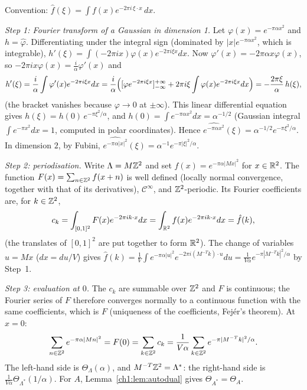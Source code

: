 \begin{humanproof}
Convention: $\hat f(\xi)=\int f(x)e^{-2\pi i\,\xi\cdot x}\,dx$.

\emph{Step 1: Fourier transform of a Gaussian in dimension 1.} Let $\varphi(x)=e^{-\pi\alpha x^2}$ and $h=\hat\varphi$.
Differentiating under the integral sign (dominated by $|x|e^{-\pi\alpha x^2}$, which is integrable),
$h'(\xi)=\int(-2\pi i x)\varphi(x)e^{-2\pi i\xi x}dx$. Now $\varphi'(x)=-2\pi\alpha x\varphi(x)$, so $-2\pi ix\varphi(x)=\frac{i}{\alpha}\varphi'(x)$ and
\[
  h'(\xi)=\frac i\alpha\int\varphi'(x)e^{-2\pi i\xi x}dx=\frac i\alpha\Bigl([\varphi e^{-2\pi i\xi x}]_{-\infty}^{+\infty}+2\pi i\xi\int\varphi(x)e^{-2\pi i\xi x}dx\Bigr)=-\frac{2\pi\xi}{\alpha}\,h(\xi),
\]
(the bracket vanishes because $\varphi\to0$ at $\pm\infty$). This linear differential equation gives $h(\xi)=h(0)\,e^{-\pi\xi^2/\alpha}$, and
$h(0)=\int e^{-\pi\alpha x^2}dx=\alpha^{-1/2}$ (Gaussian integral $\int e^{-\pi x^2}dx=1$, computed in polar coordinates). Hence
$\widehat{e^{-\pi\alpha x^2}}(\xi)=\alpha^{-1/2}e^{-\pi\xi^2/\alpha}$. In dimension $2$, by Fubini,
$\widehat{e^{-\pi\alpha|x|^2}}(\xi)=\alpha^{-1}e^{-\pi|\xi|^2/\alpha}$.

\emph{Step 2: periodisation.} Write $\Lambda=M\mathbb{Z}^2$ and set $f(x)=e^{-\pi\alpha|Mx|^2}$ for $x\in\mathbb{R}^2$. The function
$F(x)=\sum_{n\in\mathbb{Z}^2}f(x+n)$ is well defined (locally normal convergence, together with that of its derivatives), $\mathcal C^\infty$, and $\mathbb{Z}^2$-periodic.
Its Fourier coefficients are, for $k\in\mathbb{Z}^2$,
\[
  c_k=\int_{[0,1]^2}F(x)e^{-2\pi ik\cdot x}dx=\int_{\mathbb{R}^2}f(x)e^{-2\pi ik\cdot x}dx=\hat f(k),
\]
(the translates of $[0,1]^2$ are put together to form $\mathbb{R}^2$). The change of variables $u=Mx$ ($dx=du/V$) gives
$\hat f(k)=\frac1V\int e^{-\pi\alpha|u|^2}e^{-2\pi i(M^{-T}k)\cdot u}du=\frac{1}{V\alpha}e^{-\pi|M^{-T}k|^2/\alpha}$ by Step~1.

\emph{Step 3: evaluation at $0$.} The $c_k$ are summable over $\mathbb{Z}^2$ and $F$ is continuous; the Fourier series of $F$ therefore converges normally
to a continuous function with the same coefficients, which is $F$ (uniqueness of the coefficients, Fejér's theorem). At $x=0$:
\[
  \sum_{n\in\mathbb{Z}^2}e^{-\pi\alpha|Mn|^2}=F(0)=\sum_{k\in\mathbb{Z}^2}c_k=\frac{1}{V\alpha}\sum_{k\in\mathbb{Z}^2}e^{-\pi|M^{-T}k|^2/\alpha}.
\]
The left-hand side is $\Theta_\Lambda(\alpha)$, and $M^{-T}\mathbb{Z}^2=\Lambda^*$: the right-hand side is $\frac{1}{V\alpha}\Theta_{\Lambda^*}(1/\alpha)$.
For $A$, Lemma~\ref{ch1:lem:autodual} gives $\Theta_{A^*}=\Theta_A$.
\end{humanproof}

